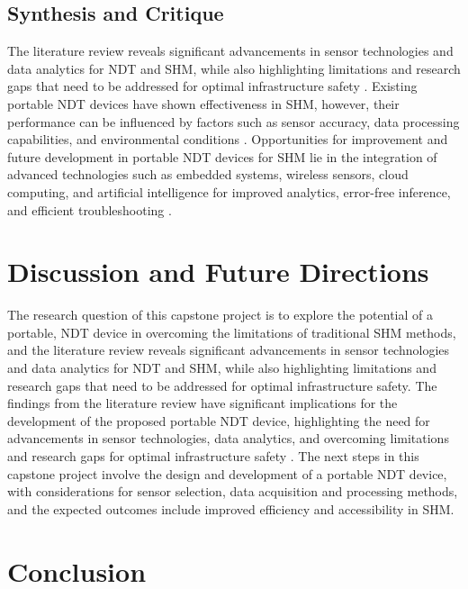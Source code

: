 \documentclass[journal, a4paper]{IEEEtran}
\begin{document}
\subsection{Synthesis and Critique}
The literature review reveals significant advancements in sensor technologies and data analytics
for NDT and SHM,
while also highlighting limitations and research gaps that need to be addressed for optimal infrastructure safety \cite{vijayan_development_2023} \cite{hassani_systematic_2023}.
Existing portable NDT devices have shown effectiveness in SHM,
however, their performance can be influenced by factors such as sensor accuracy, data processing capabilities,
and environmental conditions \cite{vijayan_development_2023} \cite{hassani_systematic_2023}.
Opportunities for improvement and future development in portable NDT devices
for SHM lie in the integration of advanced technologies such as embedded systems,
wireless sensors, cloud computing, and artificial intelligence for improved analytics, error-free inference,
and efficient troubleshooting \cite{meier_future_2018}.





\section{Discussion and Future Directions}  %
The research question of this capstone project is to explore the potential of a portable,
NDT device in overcoming the limitations of traditional SHM methods,
and the literature review reveals significant advancements in sensor technologies and data analytics for NDT and SHM,
while also highlighting limitations and research gaps that need to be addressed for optimal infrastructure safety.
The findings from the literature review have significant implications for the development of the
proposed portable NDT device, highlighting the need for advancements in sensor technologies,
data analytics, and overcoming limitations and research gaps for optimal infrastructure safety \cite{udell_future_2018} \cite{meier_future_2018}.
The next steps in this capstone project involve the design and development of a portable
NDT device, with considerations for sensor selection, data acquisition and processing methods,
and the expected outcomes include improved efficiency and accessibility in SHM.




\section{Conclusion}
\lipsum[1]
\end{document}
